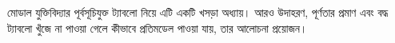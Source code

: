 \documentclass[../../../include/open-logic-chapter]{subfiles}
\begin{document}

\begin{editorial}
  মোডাল যুক্তিবিদ্যার পূর্বসূচিযুক্ত ট্যাবলো নিয়ে এটি একটি খসড়া অধ্যায়।
  আরও উদাহরণ, পূর্ণতার প্রমাণ এবং বদ্ধ ট্যাবলো খুঁজে না পাওয়া গেলে
  কীভাবে প্রতিমডেল পাওয়া যায়, তার আলোচনা প্রয়োজন।
\end{editorial}


\OLEndChapterHook
\end{document}
